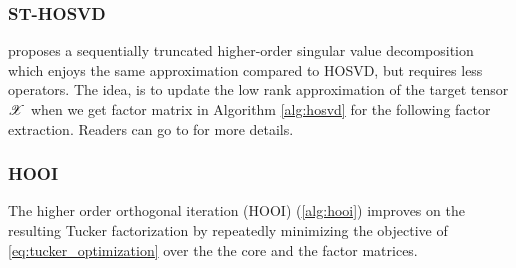 \subsubsection{ST-HOSVD} 
\citep{vannieuwenhoven2012new} proposes a sequentially truncated higher-order singular value decomposition which enjoys the same approximation compared to HOSVD, but requires less operators. The idea, is to update the low rank approximation of the target tensor $\T{X}$ when we get factor matrix in Algorithm \ref{alg:hosvd} for the following factor extraction. Readers can go to \citep{vannieuwenhoven2012new} for more details. 


\subsubsection{HOOI}
The higher order orthogonal iteration (HOOI) \citep{de2000multilinear} (\ref{alg:hooi})
improves on the resulting Tucker factorization
by repeatedly minimizing the objective of \ref{eq:tucker_optimization}
over the the core and the factor matrices.
